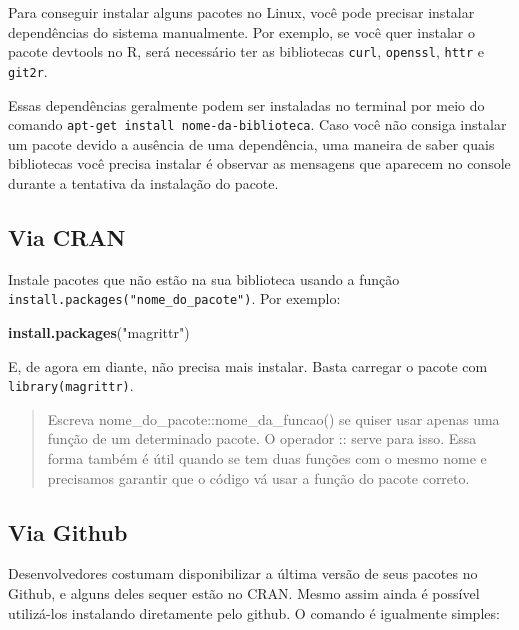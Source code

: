 \documentclass[]{book}
\newenvironment{Shaded}{\begin{snugshade}}{\end{snugshade}}
\newcommand{\KeywordTok}[1]{\textcolor[rgb]{0.13,0.29,0.53}{\textbf{#1}}}
\newcommand{\NormalTok}[1]{#1}
\newcommand{\StringTok}[1]{\textcolor[rgb]{0.31,0.60,0.02}{#1}}
\begin{document}
Para conseguir instalar alguns pacotes no Linux, você pode precisar instalar dependências do sistema manualmente. Por exemplo, se você quer instalar o pacote devtools no R, será necessário ter as bibliotecas \texttt{curl}, \texttt{openssl}, \texttt{httr} e \texttt{git2r}.

Essas dependências geralmente podem ser instaladas no terminal por meio do comando \texttt{apt-get\ install\ nome-da-biblioteca}. Caso você não consiga instalar um pacote devido a ausência de uma dependência, uma maneira de saber quais bibliotecas você precisa instalar é observar as mensagens que aparecem no console durante a tentativa da instalação do pacote.

\hypertarget{via-cran}{%
\subsection{Via CRAN}\label{via-cran}}

Instale pacotes que não estão na sua biblioteca usando a função \texttt{install.packages("nome\_do\_pacote")}. Por exemplo:

\begin{Shaded}
\begin{Highlighting}[]
\KeywordTok{install.packages}\NormalTok{(}\StringTok{"magrittr"}\NormalTok{)}
\end{Highlighting}
\end{Shaded}

E, de agora em diante, não precisa mais instalar. Basta carregar o pacote com \texttt{library(magrittr)}.

\begin{quote}
Escreva nome\_do\_pacote::nome\_da\_funcao() se quiser usar apenas uma função de um determinado pacote. O operador :: serve para isso. Essa forma também é útil quando se tem duas funções com o mesmo nome e precisamos garantir que o código vá usar a função do pacote correto.
\end{quote}

\hypertarget{via-github}{%
\subsection{Via Github}\label{via-github}}

Desenvolvedores costumam disponibilizar a última versão de seus pacotes no Github, e alguns deles sequer estão no CRAN. Mesmo assim ainda é possível utilizá-los instalando diretamente pelo github. O comando é igualmente simples:
\end{document}
